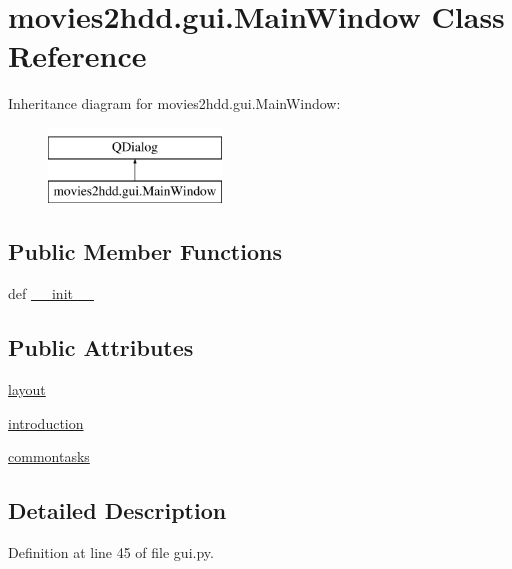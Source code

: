 \hypertarget{classmovies2hdd_1_1gui_1_1_main_window}{\section{movies2hdd.\-gui.\-Main\-Window Class Reference}
\label{classmovies2hdd_1_1gui_1_1_main_window}
}
Inheritance diagram for movies2hdd.\-gui.\-Main\-Window\-:\begin{figure}[H]
\begin{center}
\leavevmode
\includegraphics[height=2.000000cm]{classmovies2hdd_1_1gui_1_1_main_window}
\end{center}
\end{figure}
\subsection*{Public Member Functions}
\begin{DoxyCompactItemize}
\item 
def \hyperlink{classmovies2hdd_1_1gui_1_1_main_window_a2a26220b2cdbc5868ce39bbe5225d43e}{\-\_\-\-\_\-init\-\_\-\-\_\-}
\end{DoxyCompactItemize}
\subsection*{Public Attributes}
\begin{DoxyCompactItemize}
\item 
\hyperlink{classmovies2hdd_1_1gui_1_1_main_window_a33aed6a40173ad6916d4c0682d204b3a}{layout}
\item 
\hyperlink{classmovies2hdd_1_1gui_1_1_main_window_a26535b6fc26552cfc8ca56beb4d4cce7}{introduction}
\item 
\hyperlink{classmovies2hdd_1_1gui_1_1_main_window_ae67a5547b931e5c38cfa7c0c24c9dbd8}{commontasks}
\end{DoxyCompactItemize}


\subsection{Detailed Description}


Definition at line 45 of file gui.\-py.



